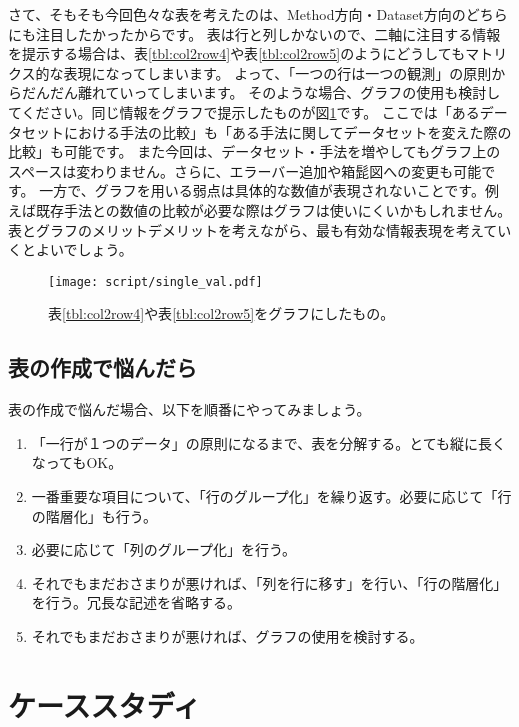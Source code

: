 \documentclass[uplatex,onecolumn,9pt,dvipdfmx]{jsarticle}
\newcommand{\Tref}[1]{表\ref{#1}}
\newcommand{\Fref}[1]{図\ref{#1}}
\begin{document}
さて、そもそも今回色々な表を考えたのは、Method方向・Dataset方向のどちらにも注目したかったからです。
表は行と列しかないので、二軸に注目する情報を提示する場合は、\Tref{tbl:col2row4}や\Tref{tbl:col2row5}のようにどうしてもマトリクス的な表現になってしまいます。
よって、「一つの行は一つの観測」の原則からだんだん離れていってしまいます。
そのような場合、グラフの使用も検討してください。同じ情報をグラフで提示したものが\Fref{fig:single_val}です。
ここでは「あるデータセットにおける手法の比較」も「ある手法に関してデータセットを変えた際の比較」も可能です。
また今回は、データセット・手法を増やしてもグラフ上のスペースは変わりません。さらに、エラーバー追加や箱髭図への変更も可能です。
一方で、グラフを用いる弱点は具体的な数値が表現されないことです。例えば既存手法との数値の比較が必要な際はグラフは使いにくいかもしれません。
表とグラフのメリットデメリットを考えながら、最も有効な情報表現を考えていくとよいでしょう。

\begin{figure}[h]
    \centering
    \texttt{[image: script/single\_val.pdf]}
    \caption{\Tref{tbl:col2row4}や\Tref{tbl:col2row5}をグラフにしたもの。}
    \label{fig:single_val}
\end{figure}





\subsection{表の作成で悩んだら}
表の作成で悩んだ場合、以下を順番にやってみましょう。
\begin{enumerate}
    \item 「一行が１つのデータ」の原則になるまで、表を分解する。とても縦に長くなってもOK。
    \item 一番重要な項目について、「行のグループ化」を繰り返す。必要に応じて「行の階層化」も行う。
    \item 必要に応じて「列のグループ化」を行う。
    \item それでもまだおさまりが悪ければ、「列を行に移す」を行い、「行の階層化」を行う。冗長な記述を省略する。
    \item それでもまだおさまりが悪ければ、グラフの使用を検討する。
\end{enumerate}


\section{ケーススタディ}
\end{document}
